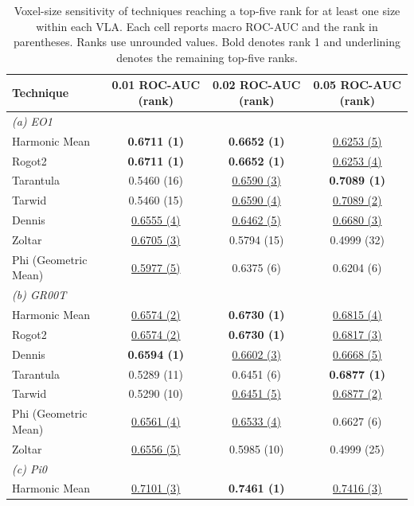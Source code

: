 \begin{table}[t]
\centering
\caption{Voxel-size sensitivity of techniques reaching a top-five rank for at least one size within each VLA. Each cell reports macro ROC-AUC and the rank in parentheses. Ranks use unrounded values. Bold denotes rank 1 and underlining denotes the remaining top-five ranks.}
\label{tab:rq2-techniques-by-vla}
{\scriptsize
\setlength{\tabcolsep}{7pt}
\renewcommand{\arraystretch}{0.96}
\begin{tabular}{lccc}
\toprule
Technique & 0.01 ROC-AUC (rank) & 0.02 ROC-AUC (rank) & 0.05 ROC-AUC (rank) \\
\midrule
\multicolumn{4}{l}{\textit{(a) EO1}} \\
Harmonic Mean & \textbf{0.6711 (1)} & \textbf{0.6652 (1)} & \underline{0.6253 (5)} \\
Rogot2 & \textbf{0.6711 (1)} & \textbf{0.6652 (1)} & \underline{0.6253 (4)} \\
Tarantula & 0.5460 (16) & \underline{0.6590 (3)} & \textbf{0.7089 (1)} \\
Tarwid & 0.5460 (15) & \underline{0.6590 (4)} & \underline{0.7089 (2)} \\
Dennis & \underline{0.6555 (4)} & \underline{0.6462 (5)} & \underline{0.6680 (3)} \\
Zoltar & \underline{0.6705 (3)} & 0.5794 (15) & 0.4999 (32) \\
Phi (Geometric Mean) & \underline{0.5977 (5)} & 0.6375 (6) & 0.6204 (6) \\
\midrule
\multicolumn{4}{l}{\textit{(b) GR00T}} \\
Harmonic Mean & \underline{0.6574 (2)} & \textbf{0.6730 (1)} & \underline{0.6815 (4)} \\
Rogot2 & \underline{0.6574 (2)} & \textbf{0.6730 (1)} & \underline{0.6817 (3)} \\
Dennis & \textbf{0.6594 (1)} & \underline{0.6602 (3)} & \underline{0.6668 (5)} \\
Tarantula & 0.5289 (11) & 0.6451 (6) & \textbf{0.6877 (1)} \\
Tarwid & 0.5290 (10) & \underline{0.6451 (5)} & \underline{0.6877 (2)} \\
Phi (Geometric Mean) & \underline{0.6561 (4)} & \underline{0.6533 (4)} & 0.6627 (6) \\
Zoltar & \underline{0.6556 (5)} & 0.5985 (10) & 0.4999 (25) \\
\midrule
\multicolumn{4}{l}{\textit{(c) Pi0}} \\
Harmonic Mean & \underline{0.7101 (3)} & \textbf{0.7461 (1)} & \underline{0.7416 (3)} \\

\end{tabular}}
\end{table}
